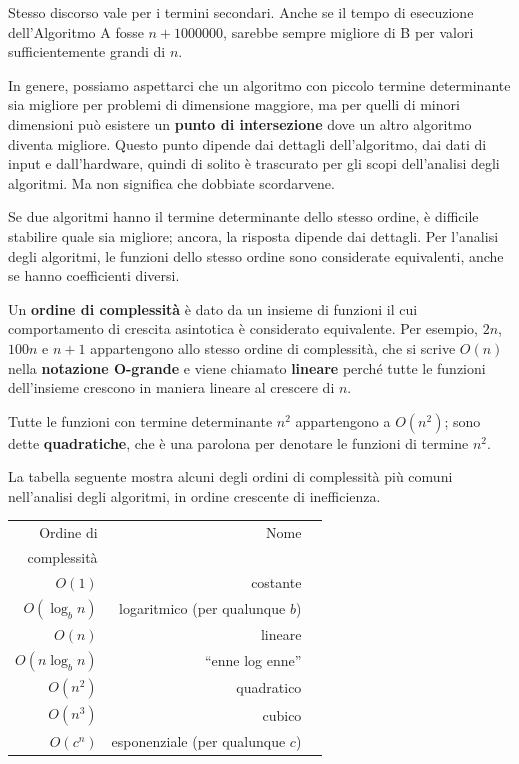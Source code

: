 \documentclass[10pt]{book}
\begin{document}
Stesso discorso vale per i termini secondari. Anche se il tempo di esecuzione dell'Algoritmo A fosse $n+1000000$, sarebbe sempre migliore di B per valori sufficientemente grandi di $n$.

In genere, possiamo aspettarci che un algoritmo con piccolo termine determinante sia migliore per problemi di dimensione maggiore, ma per quelli di minori dimensioni può esistere un {\bf punto di intersezione} dove un altro algoritmo diventa migliore. Questo punto dipende dai dettagli dell'algoritmo, dai dati di input e dall'hardware, quindi di solito è trascurato per gli scopi dell'analisi degli algoritmi. Ma non significa che dobbiate scordarvene.

Se due algoritmi hanno il termine determinante dello stesso ordine, è difficile stabilire quale sia migliore; ancora, la risposta dipende dai dettagli. Per l'analisi degli algoritmi, le funzioni dello stesso ordine sono considerate equivalenti, anche se hanno coefficienti diversi.

Un {\bf ordine di complessità} è dato da un insieme di funzioni il cui comportamento di crescita asintotica è considerato equivalente.  Per esempio, $2n$, $100n$ e $n+1$ appartengono allo stesso ordine di complessità, che si scrive $O(n)$ nella {\bf notazione O-grande} e viene chiamato {\bf lineare} perché tutte le funzioni dell'insieme crescono in maniera lineare al crescere di $n$.

Tutte le funzioni con termine determinante $n^2$ appartengono a $O(n^2)$; sono dette {\bf quadratiche}, che è una parolona per denotare le funzioni di termine $n^2$.

La tabella seguente mostra alcuni degli ordini di complessità più comuni nell'analisi degli algoritmi, in ordine crescente di inefficienza.

\begin{tabular}{|r|r|r|}
\hline
Ordine di     &   Nome      \\
complessità       &               \\
\hline
$O(1)$             & costante \\
$O(\log_b n)$      & logaritmico (per qualunque $b$) \\
$O(n)$             & lineare \\
$O(n \log_b n)$    & ``enne log enne'' \\
$O(n^2)$           & quadratico     \\
$O(n^3)$           & cubico     \\
$O(c^n)$           & esponenziale (per qualunque $c$)    \\
\hline
\end{tabular}
\end{document}
